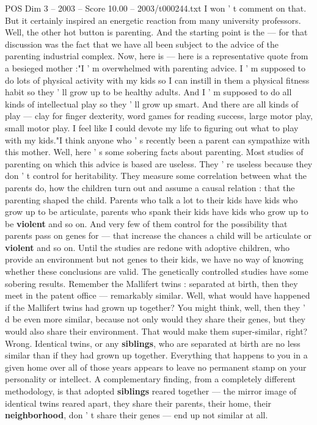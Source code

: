 \begin{textsample}{POS Dim 3 – 2003 – Score 10.00 – 2003/t000244.txt}
I won ' t comment on that.
But it certainly inspired an energetic reaction from many university professors.
Well, the other hot button is parenting.
And the starting point is the — for that discussion was the fact that we have all been subject to the advice of the parenting industrial complex.
Now, here is — here is a representative quote from a besieged mother :"I ' m overwhelmed with parenting advice.
I ' m supposed to do lots of physical activity with my kids so I can instill in them a physical fitness habit so they ' ll grow up to be healthy adults.
And I ' m supposed to do all kinds of intellectual play so they ' ll grow up smart.
And there are all kinds of play — clay for finger dexterity, word games for reading success, large motor play, small motor play.
I feel like I could devote my life to figuring out what to play with my kids."I think anyone who ' s recently been a parent can sympathize with this mother.
Well, here ' s some sobering facts about parenting.
Most studies of parenting on which this advice is based are useless.
They ' re useless because they don ' t control for heritability.
They measure some correlation between what the parents do, how the children turn out and assume a causal relation : that the parenting shaped the child.
Parents who talk a lot to their kids have kids who grow up to be articulate, parents who spank their kids have kids who grow up to be \textbf{violent} and so on.
And very few of them control for the possibility that parents pass on genes for — that increase the chances a child will be articulate or \textbf{violent} and so on.
Until the studies are redone with adoptive children, who provide an environment but not genes to their kids, we have no way of knowing whether these conclusions are valid.
The genetically controlled studies have some sobering results.
Remember the Mallifert twins : separated at birth, then they meet in the patent office — remarkably similar.
Well, what would have happened if the Mallifert twins had grown up together?
You might think, well, then they ' d be even more similar, because not only would they share their genes, but they would also share their environment.
That would make them super-similar, right?
Wrong.
Identical twins, or any \textbf{siblings}, who are separated at birth are no less similar than if they had grown up together.
Everything that happens to you in a given home over all of those years appears to leave no permanent stamp on your personality or intellect.
A complementary finding, from a completely different methodology, is that adopted \textbf{siblings} reared together — the mirror image of identical twins reared apart, they share their parents, their home, their \textbf{neighborhood}, don ' t share their genes — end up not similar at all.

\end{textsample}
